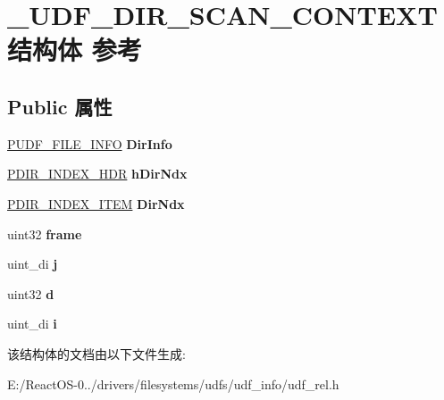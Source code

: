 \hypertarget{struct___u_d_f___d_i_r___s_c_a_n___c_o_n_t_e_x_t}{}\section{\+\_\+\+U\+D\+F\+\_\+\+D\+I\+R\+\_\+\+S\+C\+A\+N\+\_\+\+C\+O\+N\+T\+E\+X\+T结构体 参考}
\label{struct___u_d_f___d_i_r___s_c_a_n___c_o_n_t_e_x_t}
\subsection*{Public 属性}
\begin{DoxyCompactItemize}
\item 
\mbox{\label{struct___u_d_f___d_i_r___s_c_a_n___c_o_n_t_e_x_t_ad445ef83dad46a6334b1c6e8a2c9c7f9}} 
\hyperlink{struct___u_d_f___f_i_l_e___i_n_f_o}{P\+U\+D\+F\+\_\+\+F\+I\+L\+E\+\_\+\+I\+N\+FO} {\bfseries Dir\+Info}
\item 
\mbox{\label{struct___u_d_f___d_i_r___s_c_a_n___c_o_n_t_e_x_t_ae8ebe24e02735e06b53c29bec63de041}} 
\hyperlink{struct___d_i_r___i_n_d_e_x___h_d_r}{P\+D\+I\+R\+\_\+\+I\+N\+D\+E\+X\+\_\+\+H\+DR} {\bfseries h\+Dir\+Ndx}
\item 
\mbox{\label{struct___u_d_f___d_i_r___s_c_a_n___c_o_n_t_e_x_t_a6c2959c576c39b4c031321ea571c3975}} 
\hyperlink{struct___d_i_r___i_n_d_e_x___i_t_e_m}{P\+D\+I\+R\+\_\+\+I\+N\+D\+E\+X\+\_\+\+I\+T\+EM} {\bfseries Dir\+Ndx}
\item 
\mbox{\label{struct___u_d_f___d_i_r___s_c_a_n___c_o_n_t_e_x_t_a5030bd49ed0c618d02081e550c2888e7}} 
uint32 {\bfseries frame}
\item 
\mbox{\label{struct___u_d_f___d_i_r___s_c_a_n___c_o_n_t_e_x_t_a436018b33aeeba2ef1bffbf5e047e5a0}} 
uint\+\_\+di {\bfseries j}
\item 
\mbox{\label{struct___u_d_f___d_i_r___s_c_a_n___c_o_n_t_e_x_t_a80349cdf2e0e912c6e544501cdeb9f18}} 
uint32 {\bfseries d}
\item 
\mbox{\label{struct___u_d_f___d_i_r___s_c_a_n___c_o_n_t_e_x_t_ac816933569694b0f3fc2e5b9c81468a7}} 
uint\+\_\+di {\bfseries i}
\end{DoxyCompactItemize}


该结构体的文档由以下文件生成\+:\begin{DoxyCompactItemize}
\item 
E\+:/\+React\+O\+S-\/0../drivers/filesystems/udfs/udf\+\_\+info/udf\+\_\+rel.\+h\end{DoxyCompactItemize}
